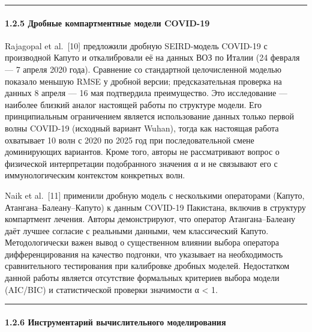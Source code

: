 \documentclass[12pt]{article}
\begin{document}
\begin{center}\rule{0.5\linewidth}{0.5pt}\end{center}

\paragraph{1.2.5 Дробные компартментные модели
COVID-19}\label{ux434ux440ux43eux431ux43dux44bux435-ux43aux43eux43cux43fux430ux440ux442ux43cux435ux43dux442ux43dux44bux435-ux43cux43eux434ux435ux43bux438-covid-19}

Rajagopal et al.~{[}10{]} предложили дробную SEIRD-модель COVID-19 с
производной Капуто и откалибровали её на данных ВОЗ по Италии (24
февраля --- 7 апреля 2020 года). Сравнение со стандартной целочисленной
моделью показало меньшую RMSE у дробной версии; предсказательная
проверка на данных 8 апреля --- 16 мая подтвердила преимущество. Это
исследование --- наиболее близкий аналог настоящей работы по структуре
модели. Его принципиальным ограничением является использование данных
только первой волны COVID-19 (исходный вариант Wuhan), тогда как
настоящая работа охватывает 10 волн с 2020 по 2025 год при
последовательной смене доминирующих вариантов. Кроме того, авторы не
рассматривают вопрос о физической интерпретации подобранного значения α
и не связывают его с иммунологическим контекстом конкретных волн.

Naik et al.~{[}11{]} применили дробную модель с несколькими операторами
(Капуто, Атангана--Балеану--Капуто) к данным COVID-19 Пакистана, включив
в структуру компартмент лечения. Авторы демонстрируют, что оператор
Атангана--Балеану даёт лучшее согласие с реальными данными, чем
классический Капуто. Методологически важен вывод о существенном влиянии
выбора оператора дифференцирования на качество подгонки, что указывает
на необходимость сравнительного тестирования при калибровке дробных
моделей. Недостатком данной работы является отсутствие формальных
критериев выбора модели (AIC/BIC) и статистической проверки значимости α
\textless{} 1.

\begin{center}\rule{0.5\linewidth}{0.5pt}\end{center}

\paragraph{1.2.6 Инструментарий вычислительного
моделирования}\label{ux438ux43dux441ux442ux440ux443ux43cux435ux43dux442ux430ux440ux438ux439-ux432ux44bux447ux438ux441ux43bux438ux442ux435ux43bux44cux43dux43eux433ux43e-ux43cux43eux434ux435ux43bux438ux440ux43eux432ux430ux43dux438ux44f}
\end{document}
